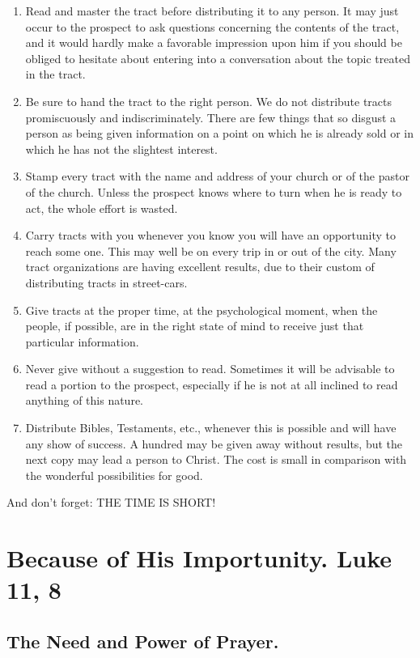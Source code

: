 \documentclass[
]{book}
\begin{document}
\begin{enumerate}
\def\labelenumi{\arabic{enumi}.}
\item
  Read and master the tract before distributing it to any person. It may just occur to the prospect to ask questions concerning the contents of the tract, and it would hardly make a favorable impression upon him if you should be obliged to hesitate about entering into a conversation about the topic treated in the tract.
\item
  Be sure to hand the tract to the right person. We do not distribute tracts promiscuously and indiscriminately. There are few things that so disgust a person as being given information on a point on which he is already sold or in which he has not the slightest interest.
\item
  Stamp every tract with the name and address of your church or of the pastor of the church. Unless the prospect knows where to turn when he is ready to act, the whole effort is wasted.
\item
  Carry tracts with you whenever you know you will have an opportunity to reach some one. This may well be on every trip in or out of the city. Many tract organizations are having excellent results, due to their custom of distributing tracts in street-cars.
\item
  Give tracts at the proper time, at the psychological moment, when the people, if possible, are in the right state of mind to receive just that particular information.
\item
  Never give without a suggestion to read. Sometimes it will be advisable to read a portion to the prospect, especially if he is not at all inclined to read anything of this nature.
\item
  Distribute Bibles, Testaments, etc., whenever this is possible and will have any show of success. A hundred may be given away without results, but the next copy may lead a person to Christ. The cost is small in comparison with the wonderful possibilities for good.
\end{enumerate}

And don't forget: THE TIME IS SHORT!

\hypertarget{because-of-his-importunity.-luke-11-8}{%
\chapter{Because of His Importunity. Luke 11, 8}\label{because-of-his-importunity.-luke-11-8}}

\hypertarget{the-need-and-power-of-prayer.}{%
\section*{The Need and Power of Prayer.}\label{the-need-and-power-of-prayer.}}
\end{document}

